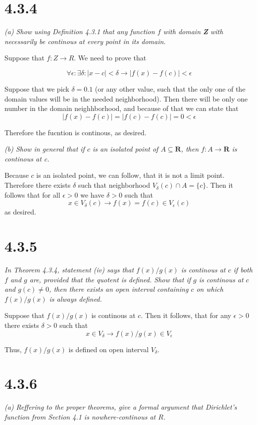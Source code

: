 \documentclass[11pt,oneside,titlepage]{book}
\begin{document}
\section*{4.3.4}
\textit{(a) Show using Definition 4.3.1 that any function $f$ with domain
  \textbf{Z} with necessarily be continous at every point in its domain.}

Suppose that $f: Z \to R$. We need to prove that 

$$\forall \epsilon: \exists \delta: |x - c| < \delta \to |f(x) - f(c)| < \epsilon $$

Suppose that we pick $\delta = 0.1$ (or any other value, such that the only one
of the domain values will be in the needed neighborhood). Then there will be
only one number in the domain neighhborhood, and because of that we can state
that
$$|f(x) - f(c)| = |f(c) - f(c)|  = 0 < \epsilon$$

Therefore the fucntion is continous, as desired.

\textit{(b) Show in general that if $c$ is an isolated point of $A \subseteq \textbf{R}$, then $f: A \to \textbf{R}$ is continous at c.}

Because $c$ is an isolated point,  we can follow, that it is not a limit
point. Therefore there exists $\delta$ such that neighborhood
$V_\delta(c) \cap A = \{c\}$. Then it follows that
for all $\epsilon > 0$ we have $\delta > 0$ such that
$$x \in V_\delta(c) \to f(x) = f(c) \in V_\epsilon(c)$$
as desired.

\section*{4.3.5}
\textit{In Theorem 4.3.4, statement (iv) says that $f(x) / g(x)$ is continous
  at $c$ if both $f$ and $g$ are, provided that the quotent is defined. Show
  that if $g$ is continous at $c$ and $g(c) \neq 0$, then there exists an open
  interval containing $c$ on which $f(x) / g(x)$ is always defined.}

Suppose that $f(x) / g(x)$ is continous at $c$. Then it follows, that for any
$\epsilon > 0$ there exists $\delta > 0$ such that
$$ x \in V_\delta \to f(x)/g(x) \in V_\epsilon$$

Thus, $f(x)/g(x)$ is defined on open interval $V_\delta$.

\section*{4.3.6}
\textit{(a) Reffering to the proper theorems, give a formal argument that
  Dirichlet's function from Section 4.1 is nowhere-continous at $R$.}
\end{document}
